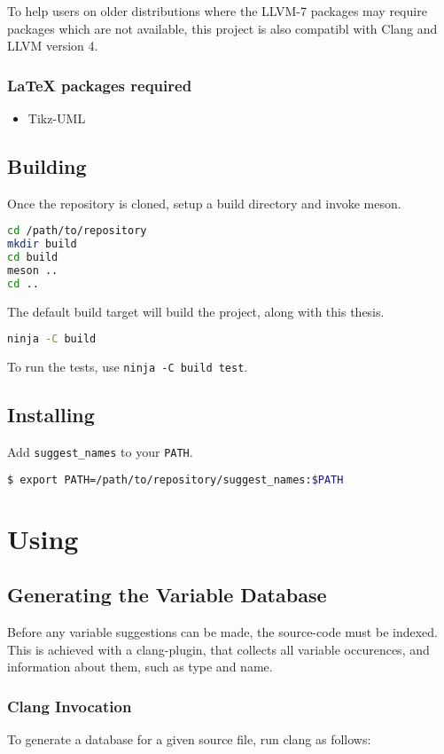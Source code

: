 To help users on older distributions where the LLVM-7 packages may require
packages which are not available, this project is also compatibl with Clang and
LLVM version 4.

\subsubsection{\LaTeX{} packages required}
\begin{itemize}
	\item Tikz-UML \cite{tikzuml}
\end{itemize}

\subsection{Building}
Once the repository is cloned, setup a build directory and invoke meson.
\begin{lstlisting}[language=bash]
cd /path/to/repository
mkdir build
cd build
meson ..
cd ..
\end{lstlisting}

The default build target will build the project, along with this thesis.
\begin{lstlisting}[language=bash]
ninja -C build
\end{lstlisting}

To run the tests, use \lstinline|ninja -C build test|.

\subsection{Installing}
Add \lstinline|suggest_names| to your \lstinline|PATH|.
\begin{lstlisting}[language=bash]
$ export PATH=/path/to/repository/suggest_names:$PATH
\end{lstlisting}


\section{Using}
\subsection{Generating the Variable Database}
Before any variable suggestions can be made, the source-code must be indexed.
This is achieved with a clang-plugin, that collects all variable occurences,
and information about them, such as type and name.

\subsubsection{Clang Invocation}
To generate a database for a given source file, run clang as follows:

